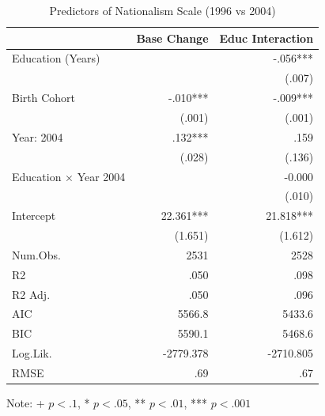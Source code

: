 \begin{table}[htbp]
\centering
\begin{threeparttable}
\caption{Predictors of Nationalism Scale (1996 vs 2004)}
\label{tab:nationalism}
\small
\begin{tabular}{lrr}
\toprule
& Base Change & Educ Interaction \\
\midrule
Education (Years) &  & -.056*** \\
&  & (.007) \\
Birth Cohort & -.010*** & -.009*** \\
& (.001) & (.001) \\
Year: 2004 & .132*** & .159 \\
& (.028) & (.136) \\
Education × Year 2004 &  & -0.000 \\
&  & (.010) \\
Intercept & 22.361*** & 21.818*** \\
& (1.651) & (1.612) \\
Num.Obs. & 2531 & 2528 \\
R2 & .050 & .098 \\
R2 Adj. & .050 & .096 \\
AIC & 5566.8 & 5433.6 \\
BIC & 5590.1 & 5468.6 \\
Log.Lik. & -2779.378 & -2710.805 \\
RMSE & .69 & .67 \\
\bottomrule
\end{tabular}
\begin{tablenotes}
\small
\item Note: + $p < .1$, * $p < .05$, ** $p < .01$, *** $p < .001$
\end{tablenotes}
\end{threeparttable}
\end{table}
